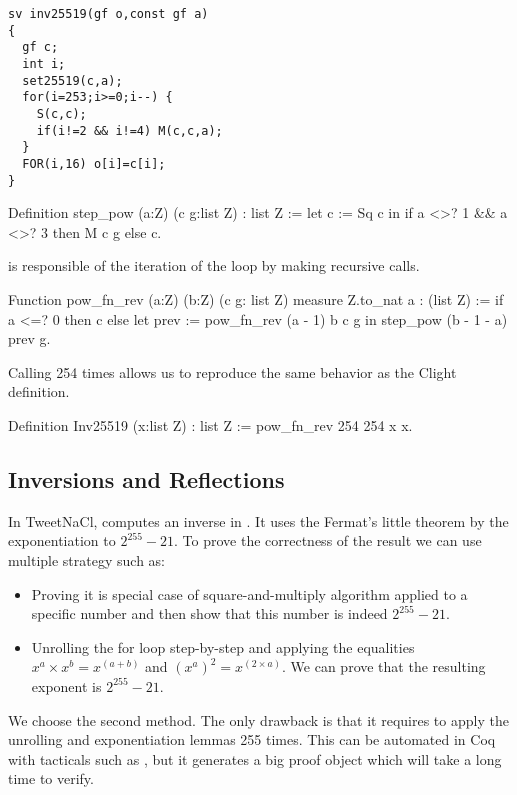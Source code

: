 \begin{lstlisting}[language=Ctweetnacl]
sv inv25519(gf o,const gf a)
{
  gf c;
  int i;
  set25519(c,a);
  for(i=253;i>=0;i--) {
    S(c,c);
    if(i!=2 && i!=4) M(c,c,a);
  }
  FOR(i,16) o[i]=c[i];
}
\end{lstlisting}

\begin{Coq}
Definition step_pow (a:Z) (c g:list Z) : list Z :=
  let c := Sq c in
    if a <>? 1 && a <>? 3
    then M c g
    else c.
\end{Coq}

 is responsible of the iteration of the loop by making
recursive calls.
\begin{Coq}
Function pow_fn_rev (a:Z) (b:Z) (c g: list Z)
  {measure Z.to_nat a} : (list Z) :=
  if a <=? 0
    then c
    else
      let prev := pow_fn_rev (a - 1) b c g in
        step_pow (b - 1 - a) prev g.
\end{Coq}


Calling  254 times allows us to reproduce the same behavior as
the Clight definition.
\begin{Coq}
Definition Inv25519 (x:list Z) : list Z :=
  pow_fn_rev 254 254 x x.
\end{Coq}

\subsection{Inversions and Reflections}

In TweetNaCl,  computes an inverse in \Zfield. It uses the
Fermat's little theorem by the exponentiation to $2^{255}-21$. To prove the
correctness of the result we can use multiple strategy such as:
\begin{itemize}
  \item Proving it is special case of square-and-multiply algorithm applied to
  a specific number and then show that this number is indeed $2^{255}-21$.
  \item Unrolling the for loop step-by-step and applying the equalities
  $x^a \times x^b = x^{(a+b)}$ and $(x^a)^2 = x^{(2 \times a)}$. We can prove that
  the resulting exponent is $2^{255}-21$.
\end{itemize}

We choose the second method. The only drawback is that it requires to apply the
unrolling and exponentiation lemmas 255 times. This can be automated in Coq with
tacticals such as , but it generates a big proof object which
will take a long time to verify.

